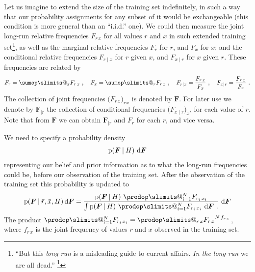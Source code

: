 \documentclass[\ifafour a4paper,12pt,\else a5paper,10pt,\fi%
onecolumn,oneside,article,%
british%
]{memoir}
\makeatletter
\theoremstyle{remark}
\theoremstyle{innote}
\def\sum{\DOTSI\sumop\slimits@}
\def\prod{\DOTSI\prodop\slimits@}
\newcommand*{\citep}{\footcites}
\newcommand*{\di}{\mathrm{d}}%
\newcommand*{\p}{\mathrm{p}}%
\renewcommand*{\|}[1][]{\nonscript\:#1\vert\nonscript\:\mathopen{}}
\renewcommand*{\=}{\TextOrMath\texteq\eq}
\newcommand*{\sect}{\S}%
\newcommand*{\q}{}%
\DeclareRobustCommand*{\q}{%
  \mathord{\mathpalette\bigcdot@{}}%
}
\newcommand*{\bigcdot@scalefactor}{0.7}
\newcommand*{\bigcdot@widthfactor}{1.5}
\newcommand*{\bigcdot@}[2]{%
  \sbox0{$#1\vcenter{}$}%
  \sbox2{$#1\cdot\m@th$}%
  \hbox to \bigcdot@widthfactor\wd2{%
    \hfil
    \raise\ht0\hbox{%
      \scalebox{\bigcdot@scalefactor}{%
        \lower\ht0\hbox{$#1\bullet\m@th$}%
      }%
    }%
    \hfil
  }%
}
\newcommand*{\rd}{\bar{r}}
\newcommand*{\xd}{\bar{x}}
\newcommand*{\yF}{\bm{F}}
\newcommand*{\yFr}{\yF_{\bm{\mid}r}}
\makeatother
\begin{document}
Let us imagine to extend the size of the training set indefinitely, in such
a way that our probability assignments for any subset of it would be
exchangeable (this condition is more general than an \enquote{i.i.d.} one).
We could then measure the joint long-run relative frequencies $F_{r\,x}$
for all values $r$ and $x$ in such extended training
set\footnote{\enquote{But this \emph{long run} is a misleading guide to
    current affairs. \emph{In the long run} we are all dead.}
  \citep[\sect~3.I, p.~65]{keynes1923_r2013}}, as well as the marginal
relative frequencies $F_{r\q}$ for $r$, and $F_{\q x}$ for $x$; and the
conditional relative frequencies $F_{r\mid x}$ for $r$ given $x$, and
$F_{x \mid r}$ for $x$ given $r$. These frequencies are related by
\begin{equation}
  \label{eq:frequencies_relations}
  F_{r\q}=\sum_{x} F_{r\,x}\ , \quad
  F_{\q x}=\sum_{r} F_{r\,x}\ ,\quad
  F_{r\mid x}=\frac{F_{r\,x}}{F_{\q x}}\ , \quad
  F_{x\mid r}=\frac{F_{r\,x}}{F_{r\q}}\ .
\end{equation}
The collection of joint frequencies $\bigl(F_{r\,x}\bigr)_{r\,x}$ is
denoted by $\yF$. For later use we denote by $\yFr$ the collection of
conditional frequencies $\bigl(F_{x\mid r}\bigr)_{x}$, for each value of
$r$. Note that from $\yF$ we can obtain $\yFr$ and $F_{r\q}$ for each $r$,
and vice versa.

\medskip

We need to specify a probability density
\begin{equation}\label{eq:prior_F}
\p(\yF \| H)\ \di\yF
\end{equation}
representing our belief and prior information as to what the long-run
frequencies could be, before our observation of the training set. After the
observation of the training set this probability is updated to
\begin{equation}
  \label{eq:post_prob_F}
  \p(\yF\|\rd,\xd, H)\,\di\yF =
  \frac{\p(\yF\| H)\ 
    \prod_{i=1}^{N} F_{r_{i}\,x_{i}}
  }{\int \p(\yF\| H)\ 
    \prod_{i=1}^{N} F_{r_{i}\,x_{i}}
              \ \di\yF \ .
  }\ \di\yF
\end{equation}
The product $\prod_{i=1}^{N} F_{r_{i}\,x_{i}} = \prod_{r\,x} {F_{r\,x}}^{N\, f_{r\,x}}$,
where $f_{r\,x}$ is the joint frequency of values $r$ and $x$ observed in
the training set.
\end{document}
